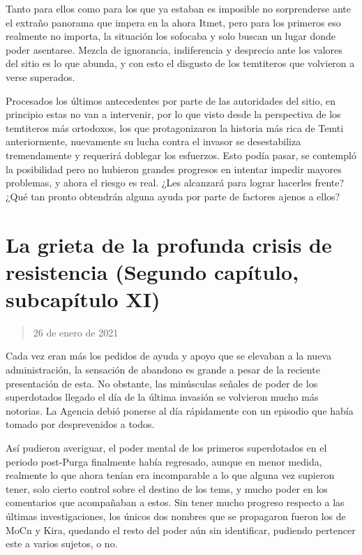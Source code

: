 \documentclass[
  spanish,
]{book}
\begin{document}
Tanto para ellos como para los que ya estaban es imposible no sorprenderse ante el extraño panorama que impera en la ahora Itmet, pero para los primeros eso realmente no importa, la situación los sofocaba y solo buscan un lugar donde poder asentarse. Mezcla de ignorancia, indiferencia y desprecio ante los valores del sitio es lo que abunda, y con esto el disgusto de los temtiteros que volvieron a verse superados.

Procesados los últimos antecedentes por parte de las autoridades del sitio, en principio estas no van a intervenir, por lo que visto desde la perspectiva de los temtiteros más ortodoxos, los que protagonizaron la historia más rica de Temti anteriormente, nuevamente su lucha contra el invasor se desestabiliza tremendamente y requerirá doblegar los esfuerzos.
Esto podía pasar, se contempló la posibilidad pero no hubieron grandes progresos en intentar impedir mayores problemas, y ahora el riesgo es real. ¿Les alcanzará para lograr hacerles frente? ¿Qué tan pronto obtendrán alguna ayuda por parte de factores ajenos a ellos?

\hypertarget{la-grieta-de-la-profunda-crisis-de-resistencia-segundo-capuxedtulo-subcapuxedtulo-xi}{%
\section{La grieta de la profunda crisis de resistencia (Segundo capítulo, subcapítulo XI)}\label{la-grieta-de-la-profunda-crisis-de-resistencia-segundo-capuxedtulo-subcapuxedtulo-xi}}

\begin{quote}
26 de enero de 2021
\end{quote}

Cada vez eran más los pedidos de ayuda y apoyo que se elevaban a la nueva administración, la sensación de abandono es grande a pesar de la reciente presentación de esta. No obstante, las minúsculas señales de poder de los superdotados llegado el día de la última invasión se volvieron mucho más notorias. La Agencia debió ponerse al día rápidamente con un episodio que había tomado por desprevenidos a todos.

Así pudieron averiguar, el poder mental de los primeros superdotados en el periodo post-Purga finalmente había regresado, aunque en menor medida, realmente lo que ahora tenían era incomparable a lo que alguna vez supieron tener, solo cierto control sobre el destino de los tems, y mucho poder en los comentarios que acompañaban a estos.
Sin tener mucho progreso respecto a las últimas investigaciones, los únicos dos nombres que se propagaron fueron los de MoCn y Kira, quedando el resto del poder aún sin identificar, pudiendo pertencer este a varios sujetos, o no.
\end{document}
